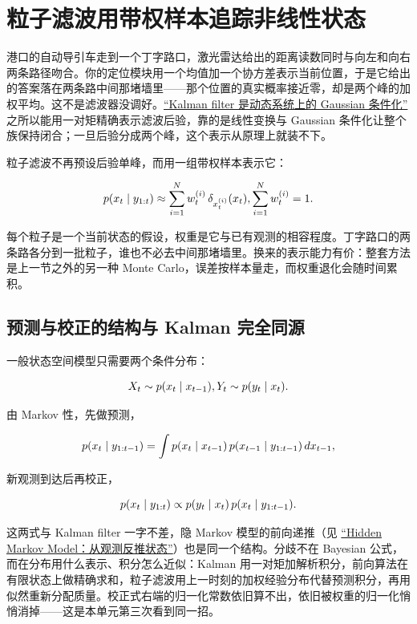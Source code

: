 \section{粒子滤波用带权样本追踪非线性状态}
\label{sec:13-Machine-Learning/08-Sampling-and-Inference/05}

港口的自动导引车走到一个丁字路口，激光雷达给出的距离读数同时与向左和向右两条路径吻合。你的定位模块用一个均值加一个协方差表示当前位置，于是它给出的答案落在两条路中间那堵墙里——那个位置的真实概率接近零，却是两个峰的加权平均。这不是滤波器没调好。\hyperref[sec:13-Machine-Learning/07-Graphical-and-Sequential-Models/03]{``Kalman filter 是动态系统上的 Gaussian 条件化''} 之所以能用一对矩精确表示滤波后验，靠的是线性变换与 Gaussian 条件化让整个族保持闭合；一旦后验分成两个峰，这个表示从原理上就装不下。

粒子滤波不再预设后验单峰，而用一组带权样本表示它：

\[
p(x_t\mid y_{1:t})
\approx\sum_{i=1}^{N}w_t^{(i)}\,\delta_{x_t^{(i)}}(x_t),
\space\sum_{i=1}^{N}w_t^{(i)}=1.
\]

每个粒子是一个当前状态的假设，权重是它与已有观测的相容程度。丁字路口的两条路各分到一批粒子，谁也不必去中间那堵墙里。换来的表示能力有价：整套方法是上一节之外的另一种 Monte Carlo，误差按样本量走，而权重退化会随时间累积。

\subsection{预测与校正的结构与 Kalman 完全同源}

一般状态空间模型只需要两个条件分布：

\[
X_t\sim p(x_t\mid x_{t-1}),\space Y_t\sim p(y_t\mid x_t).
\]

由 Markov 性，先做预测，

\[
p(x_t\mid y_{1:t-1})=\int p(x_t\mid x_{t-1})\,p(x_{t-1}\mid y_{1:t-1})\,dx_{t-1},
\]

新观测到达后再校正，

\[
p(x_t\mid y_{1:t})\propto p(y_t\mid x_t)\,p(x_t\mid y_{1:t-1}).
\]

这两式与 Kalman filter 一字不差，隐 Markov 模型的前向递推（见 \hyperref[sec:06-Random-Processes/04-Applications/04]{``Hidden Markov Model：从观测反推状态''}）也是同一个结构。分歧不在 Bayesian 公式，而在分布用什么表示、积分怎么近似：Kalman 用一对矩加解析积分，前向算法在有限状态上做精确求和，粒子滤波用上一时刻的加权经验分布代替预测积分，再用似然重新分配质量。校正式右端的归一化常数依旧算不出，依旧被权重的归一化悄悄消掉——这是本单元第三次看到同一招。

